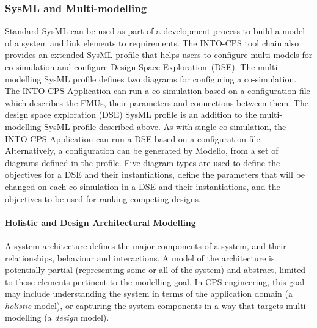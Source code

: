 
\subsubsection{SysML and Multi-modelling}
\label{sec:method:sysml}

Standard SysML can be used as part of a development process to build a model of a system and link elements to requirements. The INTO-CPS tool chain also provides an extended SysML profile that helps users to configure multi-models for co-simulation and configure Design Space Exploration~(DSE). The multi-modelling SysML profile defines two diagrams for configuring a co-simulation. The INTO-CPS Application can run a co-simulation based on a configuration file which describes the FMUs, their parameters and connections between them. The design space exploration (DSE) SysML profile is an addition to the multi-modelling SysML profile described above. As with single co-simulation, the INTO-CPS Application can run a DSE based on a configuration file. Alternatively, a configuration can be generated by Modelio, from a set of diagrams defined in the profile. Five diagram types are used to define the objectives for a DSE and their instantiations, define the parameters that will be changed on each co-simulation in a DSE and their instantiations, and the objectives to be used for ranking competing designs.

\paragraph{Holistic and Design Architectural Modelling}
\label{sec:sysml:holistic}

A system architecture defines the major components of a system, and their relationships, behaviour and interactions. A model of the architecture is potentially partial (representing some or all of the system) and abstract, limited to those elements pertinent to the modelling goal. In CPS engineering, this goal may include understanding the system in terms of the application domain (a \emph{holistic} model), or capturing the system components in a way that targets multi-modelling (a \emph{design} model).

